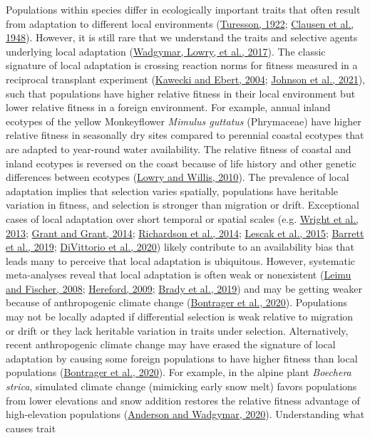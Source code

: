\documentclass[
  12pt,
]{article}
\begin{document}
Populations within species differ in ecologically important traits that often result from adaptation to different local environments (\protect\hyperlink{ref-turesson_genotypic_1922}{Turesson, 1922}; \protect\hyperlink{ref-clausen_experimental_1948}{Clausen et al., 1948}). However, it is still rare that we understand the traits and selective agents underlying local adaptation (\protect\hyperlink{ref-wadgymar_identifying_2017}{Wadgymar, Lowry, et al., 2017}). The classic signature of local adaptation is crossing reaction norms for fitness measured in a reciprocal transplant experiment (\protect\hyperlink{ref-kawecki_conceptual_2004}{Kawecki and Ebert, 2004}; \protect\hyperlink{ref-johnson_reciprocal_2021}{Johnson et al., 2021}), such that populations have higher relative fitness in their local environment but lower relative fitness in a foreign environment. For example, annual inland ecotypes of the yellow Monkeyflower \emph{Mimulus guttatus} (Phrymaceae) have higher relative fitness in seasonally dry sites compared to perennial coastal ecotypes that are adapted to year-round water availability. The relative fitness of coastal and inland ecotypes is reversed on the coast because of life history and other genetic differences between ecotypes (\protect\hyperlink{ref-lowry_widespread_2010}{Lowry and Willis, 2010}). The prevalence of local adaptation implies that selection varies spatially, populations have heritable variation in fitness, and selection is stronger than migration or drift. Exceptional cases of local adaptation over short temporal or spatial scales (e.g. \protect\hyperlink{ref-wright_indirect_2013}{Wright et al., 2013}; \protect\hyperlink{ref-grant_40_2014}{Grant and Grant, 2014}; \protect\hyperlink{ref-richardson_microgeographic_2014}{Richardson et al., 2014}; \protect\hyperlink{ref-lescak_evolution_2015}{Lescak et al., 2015}; \protect\hyperlink{ref-barrett_linking_2019}{Barrett et al., 2019}; \protect\hyperlink{ref-divittorio_natural_2020}{DiVittorio et al., 2020}) likely contribute to an availability bias that leads many to perceive that local adaptation is ubiquitous. However, systematic meta-analyses reveal that local adaptation is often weak or nonexistent (\protect\hyperlink{ref-leimu_meta-analysis_2008}{Leimu and Fischer, 2008}; \protect\hyperlink{ref-hereford_quantitative_2009}{Hereford, 2009}; \protect\hyperlink{ref-brady_understanding_2019}{Brady et al., 2019}) and may be getting weaker because of anthropogenic climate change (\protect\hyperlink{ref-bontrager_climate_2020}{Bontrager et al., 2020}). Populations may not be locally adapted if differential selection is weak relative to migration or drift or they lack heritable variation in traits under selection. Alternatively, recent anthropogenic climate change may have erased the signature of local adaptation by causing some foreign populations to have higher fitness than local populations (\protect\hyperlink{ref-bontrager_climate_2020}{Bontrager et al., 2020}). For example, in the alpine plant \emph{Boechera strica}, simulated climate change (mimicking early snow melt) favors populations from lower elevations and snow addition restores the relative fitness advantage of high-elevation populations (\protect\hyperlink{ref-anderson_climate_2020}{Anderson and Wadgymar, 2020}). Understanding what causes trait 
\end{document}
